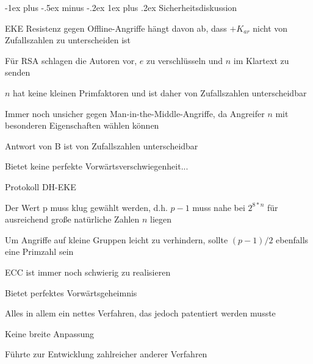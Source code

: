 \documentclass[a4paper]{article}
\makeatletter
\renewcommand{\subsubsection}{\@startsection{subsubsection}{3}{0mm}%
 {-1ex plus -.5ex minus -.2ex}%
 {1ex plus .2ex}%
 {\normalfont\small\bfseries}}
\makeatother
\begin{document}
\begin{multicols}{3}
      \subsubsection{Sicherheitsdiskussion}
      \begin{itemize*}
            \item EKE Resistenz gegen Offline-Angriffe hängt davon ab, dass $+K_{ar}$ nicht von Zufallszahlen zu unterscheiden ist
            \begin{itemize*}
                  \item Für RSA schlagen die Autoren vor, $e$ zu verschlüsseln und $n$ im Klartext zu senden
                  \item $n$ hat keine kleinen Primfaktoren und ist daher von Zufallszahlen unterscheidbar
                  \item Immer noch unsicher gegen Man-in-the-Middle-Angriffe, da Angreifer $n$ mit besonderen Eigenschaften wählen können %
                  \item Antwort von B ist von Zufallszahlen unterscheidbar
                  \item Bietet keine perfekte Vorwärtsverschwiegenheit...
            \end{itemize*}
            \item Protokoll DH-EKE
            \begin{itemize*}
                  \item Der Wert p muss klug gewählt werden, d.h. $p-1$ muss nahe bei $2^{8*n}$ für ausreichend große natürliche Zahlen $n$ liegen
                  \item Um Angriffe auf kleine Gruppen leicht zu verhindern, sollte $(p-1)/2$ ebenfalls eine Primzahl sein
                  \item ECC ist immer noch schwierig zu realisieren
                  \item Bietet perfektes Vorwärtsgeheimnis
                  \item Alles in allem ein nettes Verfahren, das jedoch patentiert werden musste
                  \begin{itemize*}
                        \item Keine breite Anpassung
                        \item Führte zur Entwicklung zahlreicher anderer Verfahren
                  \end{itemize*}
            \end{itemize*}
      \end{itemize*}


\end{multicols}
\end{document}
